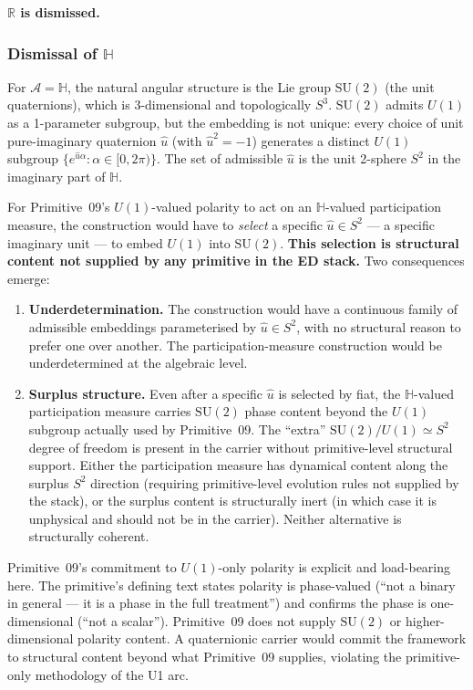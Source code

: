 \documentclass[11pt,a4paper]{article}
\begin{document}
\textbf{$\mathbb{R}$ is dismissed.}

\subsubsection{Dismissal of $\mathbb{H}$}\label{sec:F1-H}

For $\mathcal{A} = \mathbb{H}$, the natural angular structure is the Lie group $\mathrm{SU}(2)$ (the unit quaternions), which is 3-dimensional and topologically $S^3$. $\mathrm{SU}(2)$ admits $U(1)$ as a 1-parameter subgroup, but the embedding is not unique: every choice of unit pure-imaginary quaternion $\hat{u}$ (with $\hat{u}^2 = -1$) generates a distinct $U(1)$ subgroup $\{e^{\hat{u} \alpha} : \alpha \in [0, 2\pi)\}$. The set of admissible $\hat{u}$ is the unit 2-sphere $S^2$ in the imaginary part of $\mathbb{H}$.

For Primitive~09's $U(1)$-valued polarity to act on an $\mathbb{H}$-valued participation measure, the construction would have to \emph{select} a specific $\hat{u} \in S^2$ --- a specific imaginary unit --- to embed $U(1)$ into $\mathrm{SU}(2)$. \textbf{This selection is structural content not supplied by any primitive in the ED stack.} Two consequences emerge:

\begin{enumerate}
  \item \textbf{Underdetermination.} The construction would have a continuous family of admissible embeddings parameterised by $\hat{u} \in S^2$, with no structural reason to prefer one over another. The participation-measure construction would be underdetermined at the algebraic level.
  \item \textbf{Surplus structure.} Even after a specific $\hat{u}$ is selected by fiat, the $\mathbb{H}$-valued participation measure carries $\mathrm{SU}(2)$ phase content beyond the $U(1)$ subgroup actually used by Primitive~09. The ``extra'' $\mathrm{SU}(2)/U(1) \simeq S^2$ degree of freedom is present in the carrier without primitive-level structural support. Either the participation measure has dynamical content along the surplus $S^2$ direction (requiring primitive-level evolution rules not supplied by the stack), or the surplus content is structurally inert (in which case it is unphysical and should not be in the carrier). Neither alternative is structurally coherent.
\end{enumerate}

Primitive~09's commitment to $U(1)$-only polarity is explicit and load-bearing here. The primitive's defining text states polarity is phase-valued (``not a binary in general --- it is a phase in the full treatment'') and confirms the phase is one-dimensional (``not a scalar''). Primitive~09 does not supply $\mathrm{SU}(2)$ or higher-dimensional polarity content. A quaternionic carrier would commit the framework to structural content beyond what Primitive~09 supplies, violating the primitive-only methodology of the U1 arc.
\end{document}
